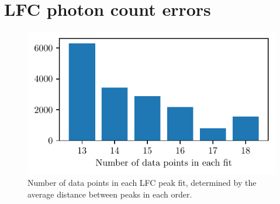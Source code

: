 
\section{LFC photon count errors}\label{appendix:LFC_errors}

\begin{figure}[ht]
    \centering
    \includegraphics[scale=0.80]{figures/N_data_points.pdf}
    \caption{Number of data points in each LFC peak fit, determined by the average distance between peaks in each order.}
    \label{fig:N_data_points}
\end{figure}

